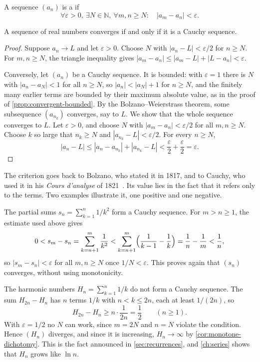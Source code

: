 \begin{definition}
\label{def:cauchy}
A sequence $(a_n)$ is a  if
\[
\forall\varepsilon>0,\ \exists N\in\mathbb N,\ \forall m,n\ge N:\quad|a_m-a_n|<\varepsilon .
\]
\end{definition}

\begin{theorem}
\label{thm:cauchy-criterion}
A sequence of real numbers converges if and only if it is a Cauchy sequence.
\end{theorem}

\begin{proof}
Suppose $a_n\to L$ and let $\varepsilon>0$. Choose $N$ with $|a_n-L|<\varepsilon/2$ for $n\ge N$. For $m,n\ge N$, the triangle inequality gives $|a_m-a_n|\le|a_m-L|+|L-a_n|<\varepsilon$.

Conversely, let $(a_n)$ be a Cauchy sequence. It is bounded: with $\varepsilon=1$ there is $N$ with $|a_n-a_N|<1$ for all $n\ge N$, so $|a_n|<|a_N|+1$ for $n\ge N$, and the finitely many earlier terms are bounded by their maximum absolute value, as in the proof of \cref{prop:convergent-bounded}. By the Bolzano--Weierstrass theorem, some subsequence $(a_{n_k})$ converges, say to $L$. We show that the whole sequence converges to $L$. Let $\varepsilon>0$, and choose $N$ with $|a_m-a_n|<\varepsilon/2$ for all $m,n\ge N$. Choose $k$ so large that $n_k\ge N$ and $|a_{n_k}-L|<\varepsilon/2$. For every $n\ge N$,
\[
|a_n-L|\le|a_n-a_{n_k}|+|a_{n_k}-L|<\frac\varepsilon2+\frac\varepsilon2=\varepsilon .
\]
\end{proof}

The criterion goes back to Bolzano, who stated it in 1817, and to Cauchy, who used it in his \emph{Cours d'analyse} of 1821~\cite{russ1980,cauchy1821,grabiner1981}. Its value lies in the fact that it refers only to the terms. Two examples illustrate it, one positive and one negative.

The partial sums $s_n=\sum_{k=1}^n1/k^2$ form a Cauchy sequence. For $m>n\ge1$, the estimate used above gives
\[
0<s_m-s_n=\sum_{k=n+1}^m\frac1{k^2}<\sum_{k=n+1}^m\Bigl(\frac1{k-1}-\frac1k\Bigr)=\frac1n-\frac1m<\frac1n ,
\]
so $|s_m-s_n|<\varepsilon$ for all $m,n\ge N$ once $1/N<\varepsilon$. This proves again that $(s_n)$ converges, without using monotonicity.

The harmonic numbers $H_n=\sum_{k=1}^n1/k$ do not form a Cauchy sequence. The sum $H_{2n}-H_n$ has $n$ terms $1/k$ with $n<k\le2n$, each at least $1/(2n)$, so
\[
H_{2n}-H_n\ge n\cdot\frac1{2n}=\frac12\qquad(n\ge1).
\]
With $\varepsilon=1/2$ no $N$ can work, since $m=2N$ and $n=N$ violate the condition. Hence $(H_n)$ diverges, and since it is increasing, $H_n\to\infty$ by \cref{cor:monotone-dichotomy}. This is the fact announced in \cref{sec:recurrences}, and \cref{ch:series} shows that $H_n$ grows like $\ln n$.

